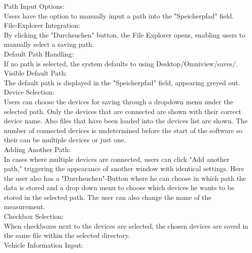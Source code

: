 \documentclass{scrreprt}
\begin{document}
Path Input Options:\\

Users have the option to manually input a path into the "Speicherpfad" field.\\

File-Explorer Integration:\\

By clicking the "Durchsuchen" button, the File Explorer opens, enabling users to manually select a saving path.\\

Default Path Handling:\\

If no path is selected, the system defaults to using Desktop/Omniview/saves/.\\

Visible Default Path:\\

The default path is displayed in the "Speicherpfad" field, appearing greyed out.\\

Device Selection:\\

Users can choose the devices for saving through a dropdown menu under the selected path.
Only the devices that are connected are shown with their correct device name.
Also files that have been loaded into the devices list are shown.
The number of connected devices is undetermined before the start of the software so their can be multiple devices or just one.\\

Adding Another Path:\\

In cases where multiple devices are connected, users can click "Add another path," triggering the appearance of another window with identical settings. Here the user also has a "Durchsuchen"-Button where he can choose in which path the data is stored and a drop down menu to choose which devices he wants to be stored in the selected path. The user can also change the name of the measurement.\\

Checkbox Selection:\\

When checkboxes next to the devices are selected, the chosen devices are saved in the same file within the selected directory.\\

Vehicle Information Input:\\
\end{document}
